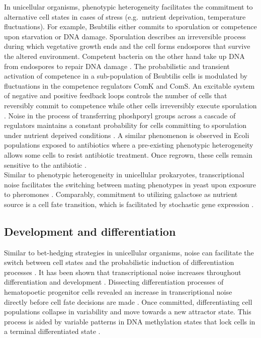 In unicellular organisms, phenotypic heterogeneity facilitates the commitment to alternative cell states in cases of stress (e.g.~nutrient deprivation, temperature fluctuations). For example, \Gls{Bsubtilis} either commits to sporulation or competence upon starvation or DNA damage. Sporulation describes an irreversible process during which vegetative growth ends and the cell forms endospores that survive the altered environment. Competent bacteria on the other hand take up DNA from endospores to repair DNA damage \citep{Schultz2009}. The probabilistic and transient activation of competence in a sub-population of \Gls{Bsubtilis} cells is modulated by fluctuations in the competence regulators ComK and ComS. An excitable system of negative and positive feedback loops controls the number of cells that reversibly commit to competence while other cells irreversibly execute sporulation \citep{Suel2006}. Noise in the process of transferring phoshporyl groups across a cascade of regulators maintains a constant probability for cells committing to sporulation under nutrient deprived conditions \citep{Russell2017}. A similar phenomenon is observed in \Gls{Ecoli} populations exposed to antibiotics where a pre-existing phenotypic heterogeneity allows some cells to resist antibiotic treatment. Once regrown, these cells remain sensitive to the antibiotic \citep{Balaban2004}. \\

Similar to phenotypic heterogeneity in unicellular prokaryotes, transcriptional noise facilitates the switching between mating phenotypes in yeast upon exposure to pheromones \citep{Paliwal2007}. Comparably, commitment to utilizing galactose as nutrient source is a cell fate transition, which is facilitated by stochastic gene expression \cite{Acar2008}. 

\subsection{Development and differentiation}

Similar to bet-hedging strategies in unicellular organisms, noise can facilitate the switch between cell states and the probabilistic induction of differentiation processes \citep{Eldar2010, Chang2008}. It has been shown that transcriptional noise increases throughout differentiation \citep{Stumpf2017} and development \citep{Antolovic2017}. Dissecting differentiation processes of hematopoetic progenitor cells revealed an increase in transcriptional noise directly before cell fate decisions are made \citep{Mojtahedi2016, Richard2016}. Once committed, differentiating cell populations collapse in variability and move towards a new attractor state. This process is aided by variable patterns in DNA methylation states that lock cells in a terminal differentiated state \citep{Jenkinson2017}. \\

